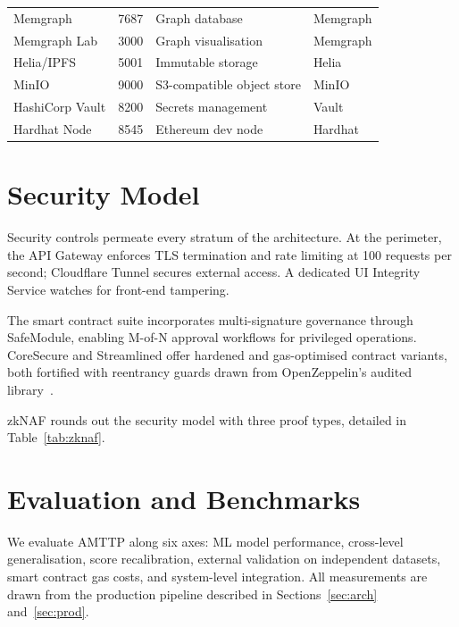 \documentclass[journal]{IEEEtran}
\begin{document}
\begin{table}[!t]
\begin{tabular}{llll}
Memgraph         & 7687  & Graph database               & Memgraph \\
Memgraph Lab     & 3000  & Graph visualisation           & Memgraph \\
Helia/IPFS       & 5001  & Immutable storage            & Helia \\
MinIO            & 9000  & S3-compatible object store   & MinIO \\
HashiCorp Vault  & 8200  & Secrets management           & Vault \\
Hardhat Node     & 8545  & Ethereum dev node            & Hardhat \\
\bottomrule
\end{tabular}
\end{table}

\section{Security Model}

Security controls permeate every stratum of the architecture. At the perimeter, the API Gateway enforces TLS termination and rate limiting at 100 requests per second; Cloudflare Tunnel secures external access. A dedicated UI Integrity Service watches for front-end tampering.

The smart contract suite incorporates multi-signature governance through SafeModule, enabling M-of-N approval workflows for privileged operations. CoreSecure and Streamlined offer hardened and gas-optimised contract variants, both fortified with reentrancy guards drawn from OpenZeppelin's audited library~\cite{openzeppelin2024}.

zkNAF rounds out the security model with three proof types, detailed in Table~\ref{tab:zknaf}.

\section{Evaluation and Benchmarks}

We evaluate AMTTP along six axes: ML model performance, cross-level generalisation, score recalibration, external validation on independent datasets, smart contract gas costs, and system-level integration. All measurements are drawn from the production pipeline described in Sections~\ref{sec:arch} and~\ref{sec:prod}.
\end{document}
